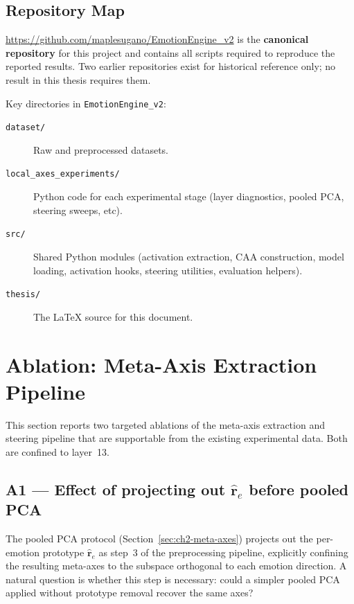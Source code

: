 \subsection*{Repository Map}

\url{https://github.com/maplesugano/EmotionEngine_v2} is the \textbf{canonical repository} for this project and contains all scripts required to reproduce the reported results. Two earlier repositories exist for historical reference only; no result in this thesis requires them.

\medskip
\noindent Key directories in \texttt{EmotionEngine\_v2}:

\begin{description}
  \item[\texttt{dataset/}] Raw and preprocessed datasets.
  \item[\texttt{local\_axes\_experiments/}] Python code for each experimental stage (layer diagnostics, pooled PCA, steering sweeps, etc). 
  \item[\texttt{src/}] Shared Python modules (activation extraction, CAA construction, model loading, activation hooks, steering utilities, evaluation helpers).
  \item[\texttt{thesis/}] The LaTeX source for this document.
\end{description}

\section{Ablation: Meta-Axis Extraction Pipeline}
\label{app:ablation}

This section reports two targeted ablations of the meta-axis extraction and steering pipeline that are supportable from the existing experimental data. Both are confined to layer~13.

\subsection*{A1 — Effect of projecting out \texorpdfstring{$\hat{\mathbf{r}}_e$}{r\_e} before pooled PCA}

The pooled PCA protocol (Section~\ref{sec:ch2-meta-axes}) projects out the per-emotion prototype $\hat{\mathbf{r}}_e$ as step~3 of the preprocessing pipeline, explicitly confining the resulting meta-axes to the subspace orthogonal to each emotion direction. A natural question is whether this step is necessary: could a simpler pooled PCA applied without prototype removal recover the same axes?

